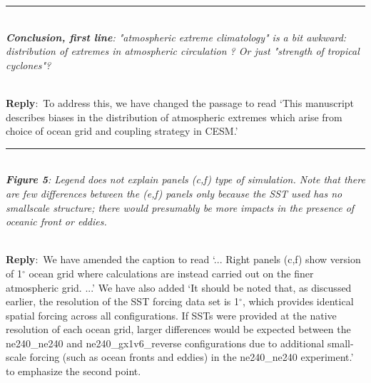 \documentclass{article}
\newcommand{\pointRaised}[2]{\medskip \hrule \noindent \\
               {\itshape {\bfseries #1}: #2}}
\newcommand{\reply}{\noindent \\ \textbf{Reply}:\ }
\newcommand{\degree}{$^{\circ}$}
\begin{document}
\pointRaised{Conclusion, first line}{"atmospheric extreme climatology" is a bit awkward: distribution of extremes in atmospheric circulation ? Or just "strength of tropical cyclones"?}

\reply{To address this, we have changed the passage to read `This manuscript describes biases in the distribution of atmospheric extremes which arise from choice of ocean grid and coupling strategy in CESM.'}

\pointRaised{Figure 5}{Legend does not explain panels (c,f) type of simulation. Note that there are few differences between the (e,f) panels only because the SST used has no smallscale structure; there would presumably be more impacts in the presence of oceanic front or eddies.}

\reply{We have amended the caption to read `... Right panels (c,f) show version of 1\degree{} ocean grid where calculations are instead carried out on the finer atmospheric grid. ...'
We have also added `It should be noted that, as discussed earlier, the resolution of the SST forcing data set is 1\degree{}, which provides identical spatial forcing across all configurations. If SSTs were provided at the native resolution of each ocean grid, larger differences would be expected between the ne240\_ne240 and ne240\_gx1v6\_reverse configurations due to additional small-scale forcing (such as ocean fronts and eddies) in the ne240\_ne240 experiment.' to emphasize the second point.}


 
\end{document}
